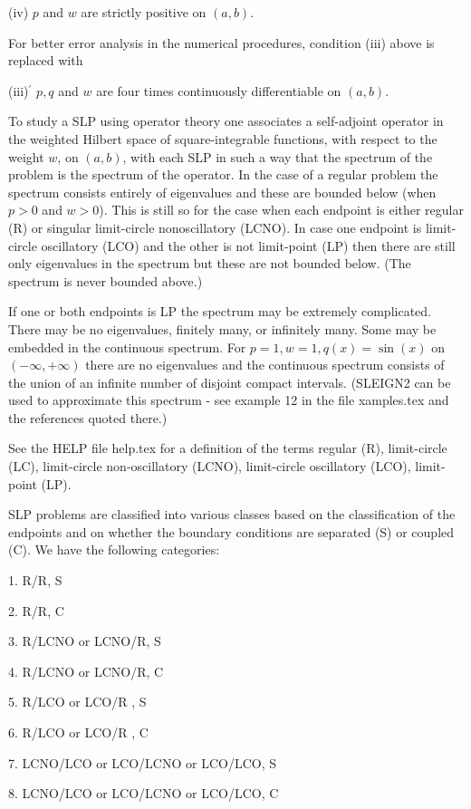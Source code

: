 \documentclass[12pt]{amsart}%
\theoremstyle{plain}
\numberwithin{equation}{section}
\numberwithin{theorem}{section}
\begin{document}
(iv) $p$ and $w$ are strictly positive on $(a,b)$.

For better error analysis in the numerical procedures, condition (iii) above
is replaced with

(iii)$^{\prime}$ $p,q$ and $w$ are four times continuously differentiable on
$(a,b)$.

To study a SLP using operator theory one associates a self-adjoint operator in
the weighted Hilbert space of square-integrable functions, with respect to the
weight $w$, on $(a,b)$, with each SLP in such a way that the spectrum of the
problem is the spectrum of the operator. In the case of a regular problem the
spectrum consists entirely of eigenvalues and these are bounded below (when
$p>0$ and $w>0$). This is still so for the case when each endpoint is either
regular (R) or singular limit-circle nonoscillatory (LCNO). In case one
endpoint is limit-circle oscillatory (LCO) and the other is not limit-point
(LP) then there are still only eigenvalues in the spectrum but these are not
bounded below. (The spectrum is never bounded above.)

If one or both endpoints is LP the spectrum may be extremely complicated.
There may be no eigenvalues, finitely many, or infinitely many. Some may be
embedded in the continuous spectrum. For $p=1,w=1,q(x)=\sin(x)$ on
$(-\infty,+\infty)$ there are no eigenvalues and the continuous spectrum
consists of the union of an infinite number of disjoint compact intervals.
(SLEIGN2 can be used to approximate this spectrum - see example 12 in the file
xamples.tex and the references quoted there.)

See the HELP file help.tex for a definition of the terms regular (R),
limit-circle (LC), limit-circle non-oscillatory (LCNO), limit-circle
oscillatory (LCO), limit-point (LP).

SLP problems are classified into various classes based on the classification
of the endpoints and on whether the boundary conditions are separated (S) or
coupled (C). We have the following categories:

1. R/R, S

2. R/R, C

3. R/LCNO or LCNO/R, S

4. R/LCNO or LCNO/R, C

5. R/LCO or LCO/R , S

6. R/LCO or LCO/R , C

7. LCNO/LCO or LCO/LCNO or LCO/LCO, S

8. LCNO/LCO or LCO/LCNO or LCO/LCO, C
\end{document}

